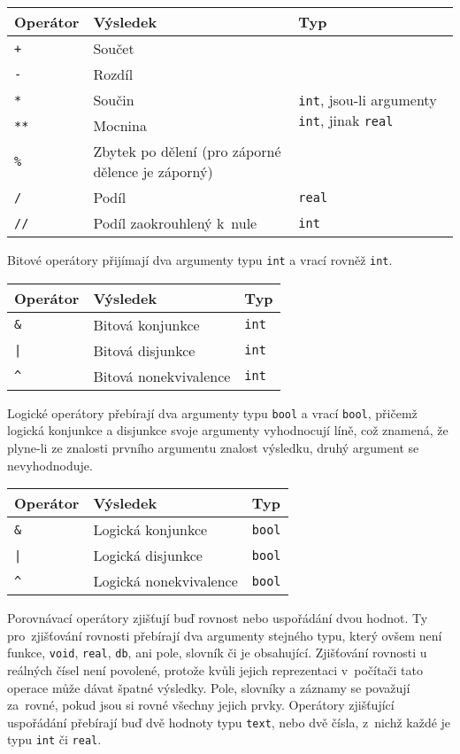 \documentclass[a4paper,12pt]{article}
\begin{document}
\begin{tabular}{|m{1.5cm} m{5cm} m{8cm}|}\hline
Operátor & Výsledek & Typ\\\hline
\texttt{+} & Součet & \multirow{5}{*}{\texttt{int}, jsou-li argumenty \texttt{int}, jinak \texttt{real}}\\
\texttt{-} & Rozdíl & \\
\texttt{*} & Součin & \\
\texttt{**} & Mocnina & \\
\texttt{\%} & Zbytek po dělení (pro záporné dělence je záporný) & \\\hline
\texttt{/} & Podíl & \texttt{real}\\\hline
\texttt{//} & Podíl zaokrouhlený k~nule & \texttt{int}\\\hline
\end{tabular}

Bitové operátory přijímají dva argumenty typu \texttt{int} a vrací rovněž \texttt{int}.

\begin{tabular}{|m{1.5cm} m{5cm} m{8cm}|}\hline
Operátor & Výsledek & Typ\\\hline
\texttt{\&} & Bitová konjunkce & \texttt{int}\\\hline
\texttt{|} & Bitová disjunkce & \texttt{int}\\\hline
\texttt{\^} & Bitová nonekvivalence & \texttt{int}\\\hline
\end{tabular}

Logické operátory přebírají dva argumenty typu \texttt{bool} a vrací \texttt{bool}, přičemž logická konjunkce a disjunkce svoje argumenty vyhodnocují líně, což znamená, že plyne-li ze znalosti prvního argumentu znalost výsledku, druhý argument se nevyhodnoduje.

\begin{tabular}{|m{1.5cm} m{5cm} m{8cm}|}\hline
Operátor & Výsledek & Typ\\\hline
\texttt{\&} & Logická konjunkce & \texttt{bool}\\\hline
\texttt{|} & Logická disjunkce & \texttt{bool}\\\hline
\texttt{\^} & Logická nonekvivalence & \texttt{bool}\\\hline
\end{tabular}

Porovnávací operátory zjišťují buď rovnost nebo uspořádání dvou hodnot. Ty pro~zjišťování rovnosti přebírají dva argumenty stejného typu, který ovšem není funkce, \texttt{void}, \texttt{real}, \texttt{db}, ani pole, slovník či je obsahující. Zjišťování rovnosti u reálných čísel není povolené, protože kvůli jejich reprezentaci v~počítači tato operace může dávat špatné výsledky. Pole, slovníky a záznamy se považují za~rovné, pokud jsou si rovné všechny jejich prvky. Operátory zjišťující uspořádání přebírají buď dvě hodnoty typu \texttt{text}, nebo dvě čísla, z~nichž každé je typu \texttt{int} či \texttt{real}.
\end{document}
